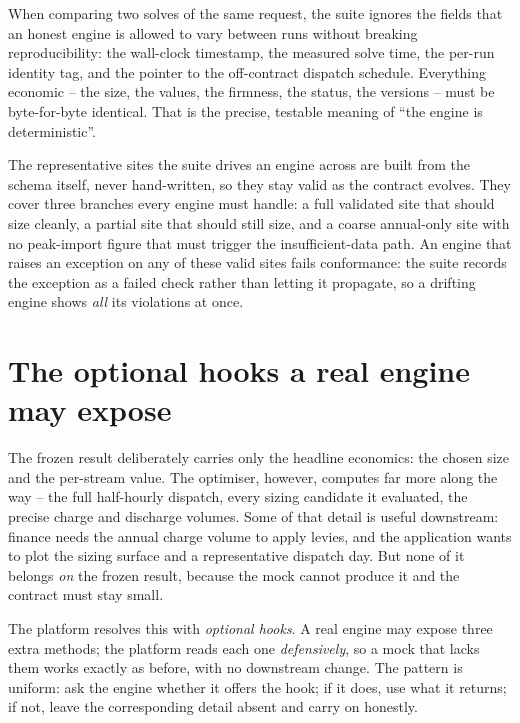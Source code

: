 \begin{plainnote}
When comparing two solves of the same request, the suite ignores the fields that an honest engine is allowed to vary between runs without breaking reproducibility: the wall-clock timestamp, the measured solve time, the per-run identity tag, and the pointer to the off-contract dispatch schedule. Everything economic -- the size, the values, the firmness, the status, the versions -- must be byte-for-byte identical. That is the precise, testable meaning of ``the engine is deterministic''.
\end{plainnote}

The representative sites the suite drives an engine across are built from the schema itself, never hand-written, so they stay valid as the contract evolves. They cover three branches every engine must handle: a full validated site that should size cleanly, a partial site that should still size, and a coarse annual-only site with no peak-import figure that must trigger the insufficient-data path. An engine that raises an exception on any of these valid sites fails conformance: the suite records the exception as a failed check rather than letting it propagate, so a drifting engine shows \emph{all} its violations at once.

\section{The optional hooks a real engine may expose}

The frozen result deliberately carries only the headline economics: the chosen size and the per-stream value. The optimiser, however, computes far more along the way -- the full half-hourly dispatch, every sizing candidate it evaluated, the precise charge and discharge volumes. Some of that detail is useful downstream: finance needs the annual charge volume to apply levies, and the application wants to plot the sizing surface and a representative dispatch day. But none of it belongs \emph{on} the frozen result, because the mock cannot produce it and the contract must stay small.

The platform resolves this with \emph{optional hooks}. A real engine may expose three extra methods; the platform reads each one \emph{defensively}, so a mock that lacks them works exactly as before, with no downstream change. The pattern is uniform: ask the engine whether it offers the hook; if it does, use what it returns; if not, leave the corresponding detail absent and carry on honestly.

